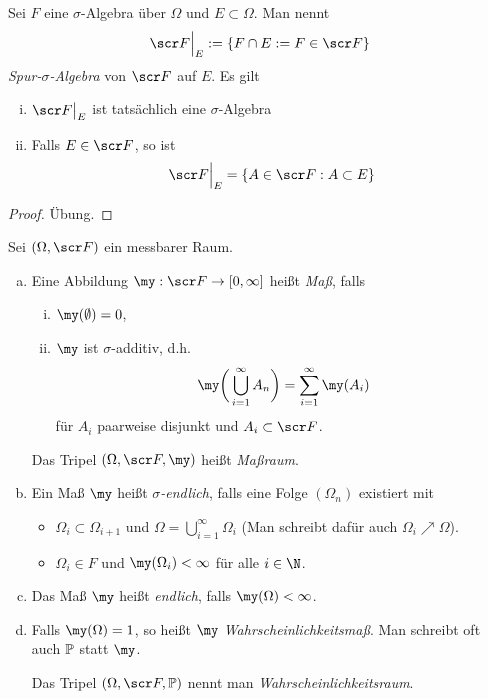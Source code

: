 \begin{nt} \label{1.1.7}
	Sei $F$ eine $\sigma$-Algebra über $\Omega$ und $E \subset \Omega$.
	Man nennt
	\[
		\scr F\Big|_E := \{ F \cap E := F \in \scr F \}
	\]
	\emph{Spur-$\sigma$-Algebra} von $\scr F$ auf $E$.
	Es gilt
	\begin{enumerate}[(i)]
		\item
			$\scr F\big|_E$ ist tatsächlich eine $\sigma$-Algebra
		\item
			Falls $E \in \scr F$, so ist
			\[
				\scr F\Big|_{E} = \{ A \in \scr F : A \subset E \}
			\]
	\end{enumerate}
	\begin{proof}
		Übung.
	\end{proof}
\end{nt}

\begin{df} \label{1.1.8}
	Sei $(\Omega, \scr F)$ ein messbarer Raum.
	\begin{enumerate}[(a)]
		\item
			Eine Abbildung $\my : \scr F \to [0,\infty]$ heißt \emph{Maß}, falls
			\begin{enumerate}[(i)]
				\item
					$\my(\emptyset) = 0$,
				\item
					$\my$ ist $\sigma$-additiv, d.h.
					\[
						\my \bigg( \bigcup_{i=1}^\infty A_n \bigg)
						= \sum_{i=1}^\infty \my(A_i)
					\]
					für $A_i$ paarweise disjunkt und $A_i \subset \scr F$.
			\end{enumerate}

			Das Tripel $(\Omega, \scr F, \my)$ heißt \emph{Maßraum}.
		\item
			Ein Maß $\my$ heißt \emph{$\sigma$-endlich}, falls eine Folge $(\Omega_n)$ existiert mit
			\begin{itemize}
				\item
					$\Omega_i \subset \Omega_{i+1}$ und	$\Omega = \bigcup_{i=1}^\infty \Omega_i$
					(Man schreibt dafür auch $\Omega_i \nearrow \Omega$).
				\item
					$\Omega_i \in F$ und $\my(\Omega_i) < \infty$ für alle $i \in \N$.
			\end{itemize}
		\item
			Das Maß $\my$ heißt \emph{endlich}, falls $\my(\Omega) < \infty$.
		\item
			Falls $\my(\Omega) = 1$, so heißt $\my$ \emph{Wahrscheinlichkeitsmaß}.
			Man schreibt oft auch $\P$ statt $\my$.

			Das Tripel $(\Omega, \scr F, \P)$ nennt man \emph{Wahrscheinlichkeitsraum}.
	\end{enumerate}
\end{df}

